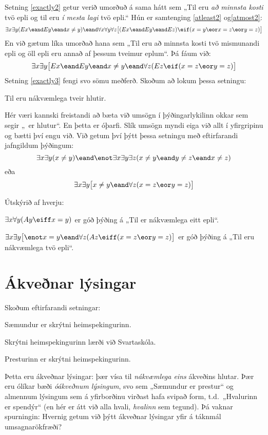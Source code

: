 Setning \ref{exactly2} getur verið umorðuð á sama hátt sem „Til eru \emph{að minnsta kosti} tvö epli og til eru \emph{í mesta lagi} tvö epli.“ Hún er samtenging \ref{atleast2} og\ref{atmost2}: $$\exists x \exists y(Ex \eand Ey \eand x \neq y) \eand \forall x\forall y\forall z\bigl[(Ex \eand Ey \eand Ez) \eif (x=y \eor x=z \eor y=z)\bigr]$$En við gætum líka umorðað hana sem „Til eru að minnsta kosti tvö mismunandi epli og öll epli eru annað af þessum tveimur eplum“. Þá fáum við: $$\exists x\exists y\bigl[Ex \eand Ey \eand x \neq y \eand \forall z(Ez \eif ( x= z \eor y = z)\bigr]$$ Setning \ref{exactly3} fengi svo sömu meðferð. Skoðum að lokum þessa setningu:
\begin{earg}
\item[\ex{exactly2things}] Til eru nákvæmlega tveir hlutir.
\end{earg}
Hér væri kannski freistandi að bæta við umsögn í þýðingarlykilinn okkar sem segir „\blank\ er hlutur“. En þetta er óþarfi. Slík umsögn myndi eiga við allt í yfirgripinu og bætti því engu við. Við getum því þýtt þessa setningu með eftirfarandi jafngildum þýðingum:
		$$\exists x \exists y (x \neq y) \eand \enot \exists x \exists y \exists z (x \neq y \eand y \neq z \eand x \neq z)$$eða
		$$\exists x \exists y \bigl[x \neq y \eand \forall z(x=z \eor y = z)\bigr]$$

\practiceproblems

\problempart Útskýrið af hverju:
	\begin{ebullet}
		\item $\exists x \forall y(Ay \eiff x= y)$ er góð þýðing á „Til er nákvæmlega eitt epli“.
		\item $\exists x \exists y \bigl[\enot x = y \eand \forall z(Az \eiff (x= z \eor y = z)\bigr]$ er góð þýðing á „Til eru nákvæmlega tvö epli“.
	\end{ebullet}		


\chapter{Ákveðnar lýsingar}\label{subsec.defdesc}
Skoðum eftirfarandi setningar:
	\begin{earg}
		\item[\ex{traitor1}] Sæmundur er skrýtni heimspekingurinn.
		\item[\ex{traitor2}] Skrýtni heimspekingurinn lærði við Svartaskóla.
		\item[\ex{traitor3}] Presturinn er skrýtni heimspekingurinn.
	\end{earg}
Þetta eru ákveðnar lýsingar: þær vísa til \emph{nákvæmlega eins} ákveðins hlutar. Þær eru ólíkar bæði \emph{óákveðnum lýsingum}, svo sem „Sæmundur er prestur“ og almennum lýsingum sem á yfirborðinu virðast hafa svipað form, t.d.\ „Hvalurinn er spendýr“ (en hér er átt við alla hvali, \emph{hvalinn} sem tegund). Þá vaknar spurningin: Hvernig getum við þýtt ákveðnar lýsingar yfir á táknmál umsagnarökfræði?

